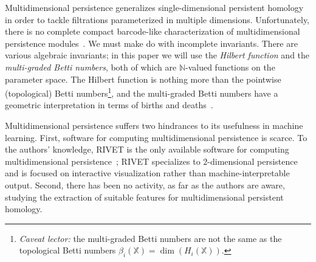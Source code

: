 \documentclass{article}
\begin{document}
Multidimensional persistence generalizes single-dimensional persistent homology
in order to tackle filtrations parameterized in multiple dimensions.
Unfortunately, there is no complete
compact barcode-like characterization of multidimensional persistence
modules~\cite{carlsson_theory_2009}. We must make do with incomplete invariants.
There are various algebraic invariants; in this paper we will use the
\textit{Hilbert function} and the \textit{multi-graded Betti numbers}, both of
which are $\mathbb{N}$-valued functions on the parameter space.
The Hilbert function is nothing more than the pointwise
(topological) Betti numbers\footnote{\textit{Caveat lector:} the multi-graded
Betti numbers are not the same as the topological Betti numbers
$\beta_i(\mathbb{X}) = \dim(H_i(\mathbb{X}))$.}, and the multi-graded Betti
numbers have a geometric interpretation in terms of births and deaths~\cite{knudson_refinement_2008}.


Multidimensional persistence suffers two hindrances to its usefulness in
machine learning. First, software for computing multidimensional persistence is
scarce. To the authors' knowledge, RIVET is the only available software for
computing multidimensional persistence~\cite{lesnick_interactive_2015}; RIVET
specializes to $2$-dimensional persistence and is focused on interactive
visualization rather than machine-interpretable output.
Second, %
there has been no activity, as far as the authors are aware, studying the extraction
of suitable features for multidimensional persistent homology.
\end{document}
